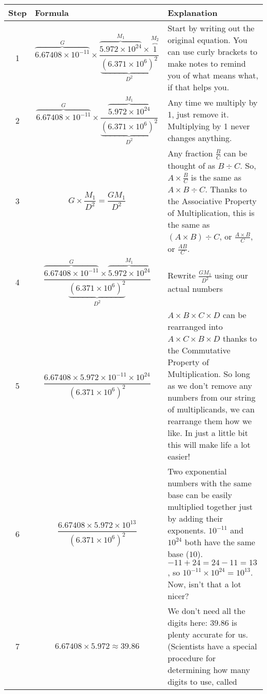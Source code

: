 \documentclass[12pt,letterpaper]{article}
\begin{document}
\begin{longtable}{| c | p{} | p{} |}
  \hline
  Step & Formula & Explanation \\
  \hline \hline
  1 & \[ \overbrace{6.67408 \times 10^{-11}}^G \times
    \frac{\overbrace{5.972 \times 10^{24}}^{M_1}\times
      \overbrace{1}^{M_2}}{\underbrace{(6.371 \times
        10^6)^2}_{D^2}} \] & Start by writing out the
  original equation.  You can use curly brackets to make notes to
  remind you of what means what, if that helps you. \\
  \hline
  2 & \[ \overbrace{6.67408 \times 10^{-11}}^G \times
  \frac{\overbrace{5.972 \times 10^{24}}^{M_1}}{\underbrace{(6.371
      \times 10^6)^2}_{D^2}} \] & Any time we multiply by 1, just remove it.
  Multiplying by 1 never changes anything. \\
  \hline
  3 & \[
    G \times \frac{M_1}{D^2} = \frac{GM_1}{D^2} \]
  & Any fraction
  $\frac{B}{C}$ can be thought of as $B \div C$.  So, 
  $A \times \frac{B}{C}$ is the same as $A \times B \div C$.
  Thanks to the Associative Property of Multiplication, this is the same as
  $(A \times B) \div C$, or $\frac{A \times B}{C}$, or $\frac{AB}{C}$.\\
  \hline
 4 & \[ \frac{\overbrace{6.67408 \times 10^{-11}}^{G}\times\overbrace{5.972
     \times 10^{24}}^{M_{1}}}{\underbrace{(6.371 \times
     10^6)^2}_{D^2}}\] & Rewrite $\frac{GM_1}{D^2}$ using our actual
 numbers \\
 \hline
  5 & \[ \frac{6.67408 \times 5.972 \times 10^{-11} \times
    10^{24}}{(6.371 \times 10^6)^2} \] & $ A \times B \times C \times D$
  can be rearranged into $A \times C \times B \times D$ thanks to the
  Commutative Property of Multiplication.  So long as we don't remove
  any numbers from our string of multiplicands, we can rearrange them
  how we like.  In just a little bit this will make life a lot easier!
  \\
  \hline
  6 & \[ \frac{6.67408 \times 5.972 \times 10^{13}}{(6.371\times10^6)^2}\] &
  Two exponential numbers with the same base can be
  easily multiplied together just by adding their exponents.
  $10^{-11}$ and $10^{24}$ both have the same base ($10$).
  $-11 + 24 = 24 - 11 = 13$, so $10^{-11} \times 10^{24} = 10^{13}$.
  Now, isn't that a lot nicer? \\
  \hline
  7 & \[ 6.67408 \times 5.972 \approx 39.86 \] & We don't need all the
  digits here: $39.86$ is plenty accurate for us.  (Scientists have a
  special procedure for determining how many digits to use, called

\end{longtable}
\end{document}
